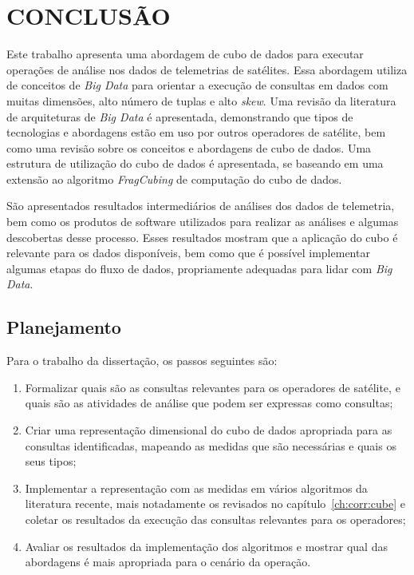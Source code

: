 
\chapter{CONCLUSÃO}\label{ch:concl}

Este trabalho apresenta uma abordagem de cubo de dados para executar operações de análise nos dados de telemetrias de satélites.
Essa abordagem utiliza de conceitos de \textit{Big Data} para orientar a execução de consultas em dados com muitas dimensões, alto número de tuplas e alto \textit{skew}.
{\color{cerulean}
Uma revisão da literatura de arquiteturas de \textit{Big Data} é apresentada, demonstrando que tipos de tecnologias e abordagens estão em uso por outros operadores de satélite, bem como uma revisão sobre os conceitos e abordagens de cubo de dados.
Uma estrutura de utilização do cubo de dados é apresentada, se baseando em uma extensão ao algoritmo \textit{FragCubing} de computação do cubo de dados.
}

São apresentados resultados intermediários de análises dos dados de telemetria, bem como os produtos de software utilizados para realizar as análises e algumas descobertas desse processo.
Esses resultados mostram que a aplicação do cubo é relevante para os dados disponíveis, bem como que é possível implementar algumas etapas do fluxo de dados, propriamente adequadas para lidar com \textit{Big Data}.

\section{Planejamento}\label{ch:concl:planning}

Para o trabalho da dissertação, os passos seguintes são:

\begin{enumerate}
\item Formalizar quais são as consultas relevantes para os operadores de satélite, e quais são as atividades de análise que podem ser expressas como consultas;
\item Criar uma representação dimensional do cubo de dados apropriada para as consultas identificadas, mapeando as medidas que são necessárias e quais os seus tipos;
\item Implementar a representação com as medidas em vários algoritmos da literatura recente, mais notadamente os revisados no capítulo~\ref{ch:corr:cube} e coletar os resultados da execução das consultas relevantes para os operadores;
\item Avaliar os resultados da implementação dos algoritmos e mostrar qual das abordagens é mais apropriada para o cenário da operação.
\end{enumerate}


